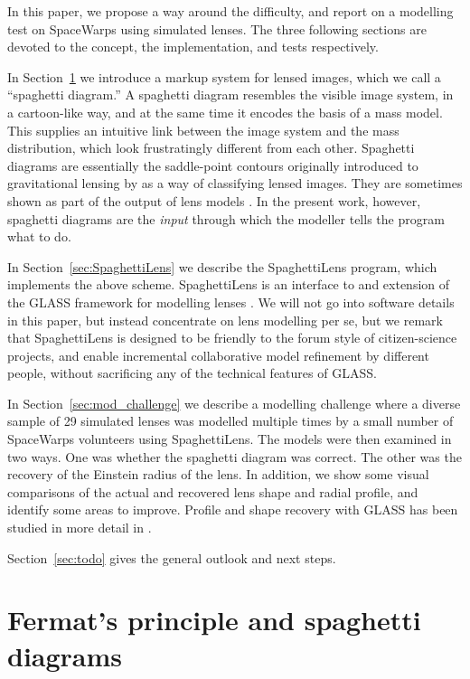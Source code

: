 \documentclass[usenatbib]{mn2e}
\newcommand{\spl}{SpaghettiLens\xspace}
\newcommand{\sw}{SpaceWarps\xspace}
\newcommand{\secref}[1]{Section~\ref{sec:#1}}
\begin{document}
In this paper, we propose a way around the difficulty, and report on a
modelling test on \sw using simulated lenses.  The three following
sections are devoted to the concept, the implementation, and tests
respectively.

In \secref{Fermat} we introduce a markup system for lensed images,
which we call a ``spaghetti diagram.''  A spaghetti diagram resembles
the visible image system, in a cartoon-like way, and at the same time
it encodes the basis of a mass model.  This supplies an intuitive link
between the image system and the mass distribution, which look
frustratingly different from each other.  Spaghetti diagrams are
essentially the saddle-point contours originally introduced to
gravitational lensing by \cite{1986ApJ...310..568B} as a way of
classifying lensed images.  They are sometimes shown as part of the
output of lens models \citep[for
example][]{2001ApJ...557..594R,2003ApJ...590...39K,Lubini2012}.  In
the present work, however, spaghetti diagrams are the {\em input\/}
through which the modeller tells the program what to do.

In \secref{SpaghettiLens} we describe the \spl program, which
implements the above scheme.  \spl is an interface to and
extension of the GLASS framework for modelling lenses
\citep{2014arXiv1401.7990C}.  We will not go into software details in
this paper, but instead concentrate on lens modelling per se, but we
remark that \spl is designed to be friendly to the forum style of
citizen-science projects, and enable incremental collaborative
model refinement by different people, without sacrificing any of the
technical features of GLASS.

In \secref{mod_challenge} we describe a modelling challenge where a
diverse sample of 29 simulated lenses was modelled multiple times
by a small number of \sw volunteers using \spl.  The models
were then examined in two ways.  One was whether the spaghetti diagram
was correct.  The other was the recovery of the Einstein radius of the
lens.  In addition, we show some visual comparisons of the actual and
recovered lens shape and radial profile, and identify some areas to
improve. Profile and shape recovery with GLASS has been studied in
more detail in \citep{2014arXiv1401.7990C}.

\secref{todo} gives the general outlook and next steps.


\section{Fermat's principle and spaghetti diagrams} \label{sec:Fermat}
\end{document}
